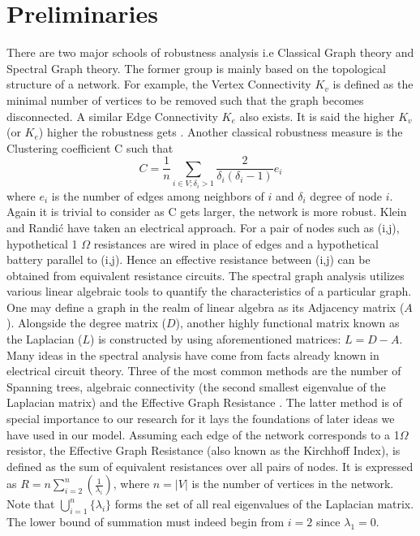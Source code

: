 \documentclass{article}
\begin{document}
	\section{Preliminaries}
	There are two major schools of robustness analysis i.e Classical Graph theory and Spectral Graph theory. The former group is mainly based on the topological structure of a network. For example, the Vertex Connectivity $K_v$ is defined as the minimal number of vertices to be removed such that the graph becomes disconnected. A similar Edge Connectivity $K_e$ also exists. It is said the higher $K_v$ (or $K_e$) higher the robustness gets \cite{ellens2013graph}. Another classical robustness measure is the Clustering coefficient \cite{watts1998collective} C such that
	\begin{equation}
		C = \frac{1}{n} \sum_{i\in V;\delta_i>1}\frac{2}{\delta_i(\delta_i -1)}e_i
	\end{equation}
	where $e_i$ is the number of edges among neighbors of $i$ and $\delta_i$ degree of node $i$. Again it is trivial to consider as C gets larger, the network is more robust.
	Klein and Randi\'{c} \cite{klein1993m} have taken an electrical approach. For a pair of nodes such as (i,j), hypothetical 1 $\Omega$ resistances are wired in place of edges and a hypothetical battery parallel to (i,j). Hence an effective resistance between (i,j) can be obtained from equivalent resistance circuits.
	The spectral graph analysis utilizes various linear algebraic tools to quantify the characteristics of a particular graph. One may define a graph in the realm of linear algebra as its Adjacency matrix ($A$). Alongside the degree matrix ($D$), another highly functional matrix known as the Laplacian ($L$) is constructed by using aforementioned matrices: $L=D-A$. Many ideas in the spectral analysis have come from facts already known in electrical circuit theory. Three of the most common methods are the number of Spanning trees, algebraic connectivity (the second smallest eigenvalue of the Laplacian matrix) and the Effective Graph Resistance \cite{ellens2013graph}. The latter method is of special importance to our research for it lays the foundations of later ideas we have used in our model. 
	Assuming each edge of the network corresponds to a 1$\Omega$ resistor, the Effective Graph Resistance (also known as the Kirchhoff Index), is defined as the sum of equivalent resistances over all pairs of nodes. It is expressed as
	$R = n \sum_{i=2}^{n}(\frac{1}{\lambda_{i}})$, where $n = |V|$ is the number of vertices in the network\cite{klein1993m}\cite{yamashita2021effective}. Note that $\bigcup_{i=1}^{n} \{\lambda_i\}$ forms the set of all real eigenvalues of the Laplacian matrix. The lower bound of summation must indeed begin from $i=2$ since $\lambda_1 = 0$.
	
\end{document}
